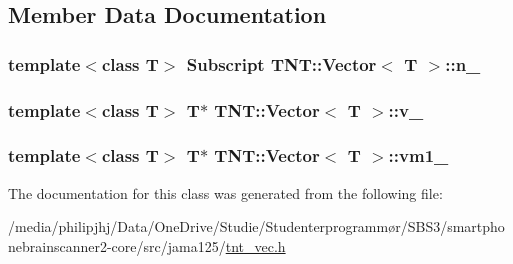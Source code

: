 \subsection{Member Data Documentation}
\hypertarget{classTNT_1_1Vector_accfd20cf0105ad3c153aeebf728f5bbc}{
\subsubsection[{n\-\_\-}]{\setlength{\rightskip}{0pt plus 5cm}template$<$class T$>$ {\bf Subscript} {\bf T\-N\-T\-::\-Vector}$<$ T $>$\-::n\-\_\-\hspace{0.3cm}{\ttfamily [protected]}}}\label{classTNT_1_1Vector_accfd20cf0105ad3c153aeebf728f5bbc}
\hypertarget{classTNT_1_1Vector_a67b413bf6956350ff9dda9faee707433}{
\subsubsection[{v\-\_\-}]{\setlength{\rightskip}{0pt plus 5cm}template$<$class T$>$ T$\ast$ {\bf T\-N\-T\-::\-Vector}$<$ T $>$\-::v\-\_\-\hspace{0.3cm}{\ttfamily [protected]}}}\label{classTNT_1_1Vector_a67b413bf6956350ff9dda9faee707433}
\hypertarget{classTNT_1_1Vector_a55f5ebf43f5af53aabdfae15a1ce11d4}{
\subsubsection[{vm1\-\_\-}]{\setlength{\rightskip}{0pt plus 5cm}template$<$class T$>$ T$\ast$ {\bf T\-N\-T\-::\-Vector}$<$ T $>$\-::vm1\-\_\-\hspace{0.3cm}{\ttfamily [protected]}}}\label{classTNT_1_1Vector_a55f5ebf43f5af53aabdfae15a1ce11d4}


The documentation for this class was generated from the following file\-:\begin{DoxyCompactItemize}
\item 
/media/philipjhj/\-Data/\-One\-Drive/\-Studie/\-Studenterprogrammør/\-S\-B\-S3/smartphonebrainscanner2-\/core/src/jama125/\hyperlink{tnt__vec_8h}{tnt\-\_\-vec.\-h}\end{DoxyCompactItemize}

